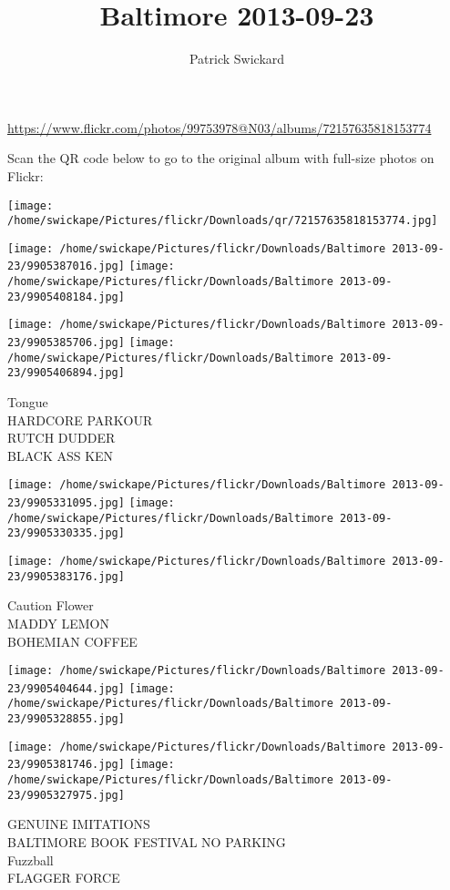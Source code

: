 \documentclass[10pt,letterpaper]{article}
\title{Baltimore 2013-09-23}
\author{Patrick Swickard}
\date{}
\begin{document}
\maketitle

\url{https://www.flickr.com/photos/99753978@N03/albums/72157635818153774}

Scan the QR code below to go to the original album with full-size photos on Flickr:

\texttt{[image: /home/swickape/Pictures/flickr/Downloads/qr/72157635818153774.jpg]}
\pagebreak

\texttt{[image: /home/swickape/Pictures/flickr/Downloads/Baltimore 2013-09-23/9905387016.jpg]}
\texttt{[image: /home/swickape/Pictures/flickr/Downloads/Baltimore 2013-09-23/9905408184.jpg]}

\texttt{[image: /home/swickape/Pictures/flickr/Downloads/Baltimore 2013-09-23/9905385706.jpg]}
\texttt{[image: /home/swickape/Pictures/flickr/Downloads/Baltimore 2013-09-23/9905406894.jpg]}

Tongue\\
HARDCORE PARKOUR\\
RUTCH DUDDER\\
BLACK ASS KEN
\pagebreak

\texttt{[image: /home/swickape/Pictures/flickr/Downloads/Baltimore 2013-09-23/9905331095.jpg]}
\texttt{[image: /home/swickape/Pictures/flickr/Downloads/Baltimore 2013-09-23/9905330335.jpg]}

\vspace{0.25in}
\texttt{[image: /home/swickape/Pictures/flickr/Downloads/Baltimore 2013-09-23/9905383176.jpg]}

Caution Flower\\
MADDY LEMON\\
BOHEMIAN COFFEE
\pagebreak

\texttt{[image: /home/swickape/Pictures/flickr/Downloads/Baltimore 2013-09-23/9905404644.jpg]}
\texttt{[image: /home/swickape/Pictures/flickr/Downloads/Baltimore 2013-09-23/9905328855.jpg]}

\texttt{[image: /home/swickape/Pictures/flickr/Downloads/Baltimore 2013-09-23/9905381746.jpg]}
\texttt{[image: /home/swickape/Pictures/flickr/Downloads/Baltimore 2013-09-23/9905327975.jpg]}

GENUINE IMITATIONS\\
BALTIMORE BOOK FESTIVAL NO PARKING\\
Fuzzball\\
FLAGGER FORCE
\pagebreak
\end{document}
